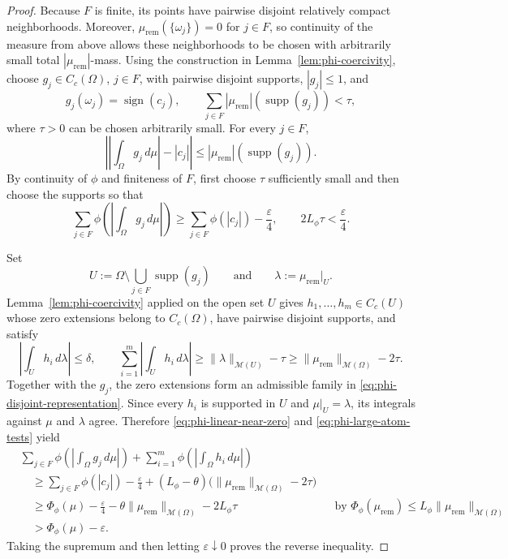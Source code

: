 \documentclass[11pt]{amsart}
\theoremstyle{definition}
\theoremstyle{remark}
\DeclareMathOperator{\sign}{sign}
\DeclareMathOperator{\supp}{supp}
\begin{document}
\begin{proof}
Because $F$ is finite, its points have pairwise disjoint relatively compact
neighborhoods. Moreover,
$\mu_{\mathrm{rem}}(\{\omega_j\})=0$ for $j\in F$, so continuity of the measure from above
allows these neighborhoods to be chosen with arbitrarily small total
$|\mu_{\mathrm{rem}}|$-mass. Using the construction in
Lemma~\ref{lem:phi-coercivity}, choose $g_j\in C_c(\Omega)$, $j\in F$, with
pairwise disjoint supports, $|g_j|\le1$, and
\begin{equation*}
	g_j(\omega_j)=\sign(c_j),
	\qquad
	\sum_{j\in F}|\mu_{\mathrm{rem}}|(\supp(g_j))<\tau,
\end{equation*}
where $\tau>0$ can be chosen arbitrarily small. For every $j\in F$,
\begin{equation*}
	\left|
	\left|\int_\Omega g_j\,d\mu\right|-|c_j|
	\right|
	\le |\mu_{\mathrm{rem}}|(\supp(g_j)).
\end{equation*}
By continuity of $\phi$ and finiteness of $F$, first choose $\tau$
sufficiently small and then choose the supports so that
\begin{equation}
\label{eq:phi-large-atom-tests}
	\sum_{j\in F}
	\phi\left(\left|\int_\Omega g_j\,d\mu\right|\right)
	\ge\sum_{j\in F}\phi(|c_j|)-\frac{\varepsilon}{4},
	\qquad
	2L_\phi\tau<\frac{\varepsilon}{4}.
\end{equation}

Set
\begin{equation*}
	U:=\Omega\setminus\bigcup_{j\in F}\supp(g_j)
	\qquad\text{and}\qquad
	\lambda:=\mu_{\mathrm{rem}}|_U.
\end{equation*}
Lemma~\ref{lem:phi-coercivity} applied on the open set $U$ gives
$h_1,\ldots,h_m\in C_c(U)$ whose zero extensions belong to $C_c(\Omega)$,
have pairwise disjoint supports, and satisfy
\begin{equation*}
	\left|\int_Uh_i\,d\lambda\right|\le\delta,
	\qquad
	\sum_{i=1}^m\left|\int_Uh_i\,d\lambda\right|
	\ge\|\lambda\|_{\mathcal M(U)}-\tau
	\ge\|\mu_{\mathrm{rem}}\|_{\mathcal M(\Omega)}-2\tau.
\end{equation*}
Together with the $g_j$, the zero extensions form an admissible family in
\eqref{eq:phi-disjoint-representation}. Since every $h_i$ is supported in
$U$ and $\mu|_U=\lambda$, its integrals against $\mu$ and $\lambda$ agree.
Therefore \eqref{eq:phi-linear-near-zero} and
\eqref{eq:phi-large-atom-tests} yield
\begin{align*}
	&\sum_{j\in F}
	\phi\left(\left|\int_\Omega g_j\,d\mu\right|\right)
	+\sum_{i=1}^m
	\phi\left(\left|\int_\Omega h_i\,d\mu\right|\right)\\
	&\quad\ge
	\sum_{j\in F}\phi(|c_j|)-\frac{\varepsilon}{4}
	+(L_\phi-\theta)
	\bigl(\|\mu_{\mathrm{rem}}\|_{\mathcal M(\Omega)}-2\tau\bigr)\\
	&\quad\ge
	\Phi_\phi(\mu)-\frac{\varepsilon}{4}
	-\theta\|\mu_{\mathrm{rem}}\|_{\mathcal M(\Omega)}-2L_\phi\tau
	&&\text{by }\Phi_\phi(\mu_{\mathrm{rem}})
	\le L_\phi\|\mu_{\mathrm{rem}}\|_{\mathcal M(\Omega)}\\
	&\quad>\Phi_\phi(\mu)-\varepsilon.
\end{align*}
Taking the supremum and then letting $\varepsilon\downarrow0$ proves the
reverse inequality.
\end{proof}
\end{document}
